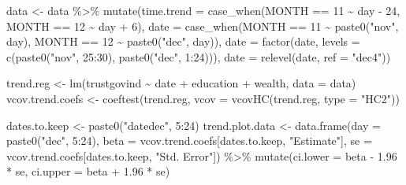 \documentclass[
  letterpaper,
  DIV=11,
  numbers=noendperiod]{scrartcl}
\newenvironment{Shaded}{\begin{snugshade}}{\end{snugshade}}
\newcommand{\AttributeTok}[1]{\textcolor[rgb]{0.40,0.45,0.13}{#1}}
\newcommand{\DecValTok}[1]{\textcolor[rgb]{0.68,0.00,0.00}{#1}}
\newcommand{\FloatTok}[1]{\textcolor[rgb]{0.68,0.00,0.00}{#1}}
\newcommand{\FunctionTok}[1]{\textcolor[rgb]{0.28,0.35,0.67}{#1}}
\newcommand{\NormalTok}[1]{\textcolor[rgb]{0.00,0.23,0.31}{#1}}
\newcommand{\OtherTok}[1]{\textcolor[rgb]{0.00,0.23,0.31}{#1}}
\newcommand{\SpecialCharTok}[1]{\textcolor[rgb]{0.37,0.37,0.37}{#1}}
\newcommand{\StringTok}[1]{\textcolor[rgb]{0.13,0.47,0.30}{#1}}
\begin{document}
\begin{Shaded}
\begin{Highlighting}[]
\NormalTok{data }\OtherTok{\textless{}{-}}\NormalTok{ data }\SpecialCharTok{\%\textgreater{}\%}
  \FunctionTok{mutate}\NormalTok{(}\AttributeTok{time.trend =} \FunctionTok{case\_when}\NormalTok{(MONTH }\SpecialCharTok{==} \DecValTok{11} \SpecialCharTok{\textasciitilde{}}\NormalTok{ day }\SpecialCharTok{{-}} \DecValTok{24}\NormalTok{,}
\NormalTok{                                MONTH }\SpecialCharTok{==} \DecValTok{12} \SpecialCharTok{\textasciitilde{}}\NormalTok{ day }\SpecialCharTok{+} \DecValTok{6}\NormalTok{),}
         \AttributeTok{date =} \FunctionTok{case\_when}\NormalTok{(MONTH }\SpecialCharTok{==} \DecValTok{11} \SpecialCharTok{\textasciitilde{}} \FunctionTok{paste0}\NormalTok{(}\StringTok{"nov"}\NormalTok{, day),}
\NormalTok{                         MONTH }\SpecialCharTok{==} \DecValTok{12} \SpecialCharTok{\textasciitilde{}} \FunctionTok{paste0}\NormalTok{(}\StringTok{"dec"}\NormalTok{, day)),}
         \AttributeTok{date =} \FunctionTok{factor}\NormalTok{(date, }\AttributeTok{levels =} \FunctionTok{c}\NormalTok{(}\FunctionTok{paste0}\NormalTok{(}\StringTok{"nov"}\NormalTok{, }\DecValTok{25}\SpecialCharTok{:}\DecValTok{30}\NormalTok{), }\FunctionTok{paste0}\NormalTok{(}\StringTok{"dec"}\NormalTok{, }\DecValTok{1}\SpecialCharTok{:}\DecValTok{24}\NormalTok{))),}
         \AttributeTok{date =} \FunctionTok{relevel}\NormalTok{(date, }\AttributeTok{ref =} \StringTok{"dec4"}\NormalTok{))}

\NormalTok{trend.reg }\OtherTok{\textless{}{-}} \FunctionTok{lm}\NormalTok{(trustgovind }\SpecialCharTok{\textasciitilde{}}\NormalTok{ date }\SpecialCharTok{+}\NormalTok{ education }\SpecialCharTok{+}\NormalTok{ wealth, }\AttributeTok{data =}\NormalTok{ data)}
\NormalTok{vcov.trend.coefs }\OtherTok{\textless{}{-}} \FunctionTok{coeftest}\NormalTok{(trend.reg, }\AttributeTok{vcov =} \FunctionTok{vcovHC}\NormalTok{(trend.reg, }\AttributeTok{type =} \StringTok{"HC2"}\NormalTok{))}

\NormalTok{dates.to.keep }\OtherTok{\textless{}{-}} \FunctionTok{paste0}\NormalTok{(}\StringTok{"datedec"}\NormalTok{, }\DecValTok{5}\SpecialCharTok{:}\DecValTok{24}\NormalTok{)}
\NormalTok{trend.plot.data }\OtherTok{\textless{}{-}} \FunctionTok{data.frame}\NormalTok{(}\AttributeTok{day =} \FunctionTok{paste0}\NormalTok{(}\StringTok{"dec"}\NormalTok{, }\DecValTok{5}\SpecialCharTok{:}\DecValTok{24}\NormalTok{),}
                              \AttributeTok{beta =}\NormalTok{ vcov.trend.coefs[dates.to.keep, }\StringTok{"Estimate"}\NormalTok{],}
                              \AttributeTok{se =}\NormalTok{ vcov.trend.coefs[dates.to.keep, }\StringTok{"Std. Error"}\NormalTok{]) }\SpecialCharTok{\%\textgreater{}\%} 
  \FunctionTok{mutate}\NormalTok{(}\AttributeTok{ci.lower  =}\NormalTok{ beta }\SpecialCharTok{{-}} \FloatTok{1.96} \SpecialCharTok{*}\NormalTok{ se,}
         \AttributeTok{ci.upper =}\NormalTok{ beta }\SpecialCharTok{+} \FloatTok{1.96} \SpecialCharTok{*}\NormalTok{ se)}


\end{Highlighting}
\end{Shaded}
\end{document}
